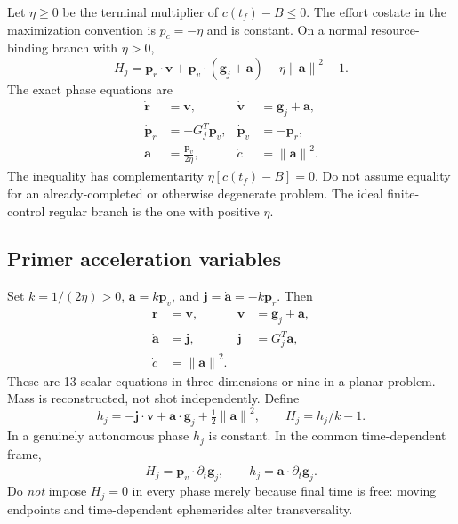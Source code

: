 \documentclass[journal, a4paper]{IEEEtran}
\newcommand{\norm}[1]{\left\lVert#1\right\rVert}
\begin{document}
Let $\eta\ge0$ be the terminal multiplier of $c(t_f)-B\le0$. The effort costate in the maximization convention is $p_c=-\eta$ and is constant. On a normal resource-binding branch with $\eta>0$,
\begin{equation}
 H_j=\mathbf p_r\cdot\mathbf v+
 \mathbf p_v\cdot(\mathbf g_j+\mathbf a)-\eta\norm{\mathbf a}^2-1.
\end{equation}
The exact phase equations are
\begin{align}
 \dot{\mathbf r}&=\mathbf v,&\dot{\mathbf v}&=\mathbf g_j+\mathbf a,\nonumber\\
 \dot{\mathbf p}_r&=-G_j^T\mathbf p_v,&
 \dot{\mathbf p}_v&=-\mathbf p_r,\label{eq:canonical}\\
 \mathbf a&=\boxed{\frac{\mathbf p_v}{2\eta}},&\dot c&=\norm{\mathbf a}^2.\nonumber
\end{align}
The inequality has complementarity $\eta[c(t_f)-B]=0$. Do not assume equality for an already-completed or otherwise degenerate problem. The ideal finite-control regular branch is the one with positive $\eta$.

\subsection{Primer acceleration variables}
Set $k=1/(2\eta)>0$, $\mathbf a=k\mathbf p_v$, and $\mathbf j=\dot{\mathbf a}=-k\mathbf p_r$. Then
\begin{equation}
 \boxed{
 \begin{aligned}
 \dot{\mathbf r}&=\mathbf v, &\dot{\mathbf v}&=\mathbf g_j+\mathbf a,\\
 \dot{\mathbf a}&=\mathbf j, &\dot{\mathbf j}&=G_j^T\mathbf a,\\
 \dot c&=\norm{\mathbf a}^2.
 \end{aligned}}
 \label{eq:primer}
\end{equation}
These are 13 scalar equations in three dimensions or nine in a planar problem. Mass is reconstructed, not shot independently. Define
\begin{equation}
 h_j=-\mathbf j\cdot\mathbf v+\mathbf a\cdot\mathbf g_j+
           \tfrac12\norm{\mathbf a}^2,
 \qquad H_j=h_j/k-1.
 \label{eq:h}
\end{equation}
In a genuinely autonomous phase $h_j$ is constant. In the common time-dependent frame,
\begin{equation}
 \dot H_j=\mathbf p_v\cdot\partial_t\mathbf g_j,
 \qquad \dot h_j=\mathbf a\cdot\partial_t\mathbf g_j.
\end{equation}
Do \emph{not} impose $H_j=0$ in every phase merely because final time is free: moving endpoints and time-dependent ephemerides alter transversality.
\end{document}
